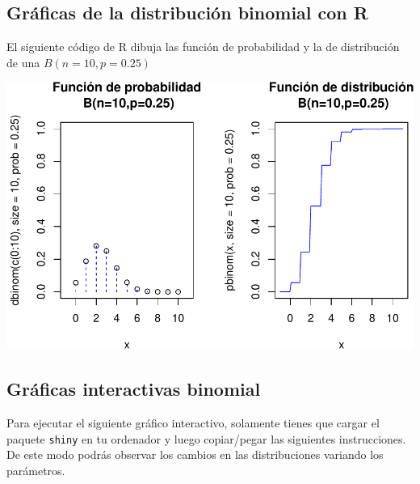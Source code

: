 \documentclass[]{book}
\begin{document}
\hypertarget{gruxe1ficas-de-la-distribuciuxf3n-binomial-con-r-1}{%
\subsection{Gráficas de la distribución binomial con R}\label{gruxe1ficas-de-la-distribuciuxf3n-binomial-con-r-1}}

El siguiente código de R dibuja las función de probabilidad y la de distribución de una \(B(n=10,p=0.25)\)

\begin{center}\includegraphics{curso-probabilidad-udemy_files/figure-latex/unnamed-chunk-21-1} \end{center}

\hypertarget{gruxe1ficas-interactivas-binomial}{%
\subsection{Gráficas interactivas binomial}\label{gruxe1ficas-interactivas-binomial}}

Para ejecutar el siguiente gráfico interactivo, solamente tienes que cargar el paquete \texttt{shiny} en tu ordenador y luego copiar/pegar las siguientes instrucciones. De este modo podrás observar los cambios en las distribuciones variando los parámetros.
\end{document}
